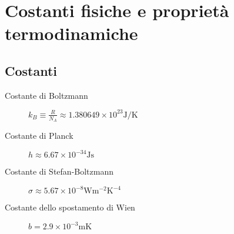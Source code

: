 \documentclass[10pt, oneside]{article}
\begin{document}
\section{Costanti fisiche e proprietà termodinamiche}
\subsection{Costanti}
\begin{description}
\item[Costante di Boltzmann] $\displaystyle k_B \equiv \frac{R}{N_A} \approx 1.380649 \times 10^{23} \mathrm{J/K}$ 
\item[Costante di Planck] $\displaystyle h \approx 6.67 \times 10^{-34} \mathrm{Js}$
\item[Costante di Stefan-Boltzmann] $\displaystyle \sigma \approx 5.67 \times 10^{-8} \mathrm{W m^{-2} K^{-4}}$
\item[Costante dello spostamento di Wien] $\displaystyle b = 2.9 \times 10^{-3} \mathrm{m K}$
\end{description}
\end{document}
